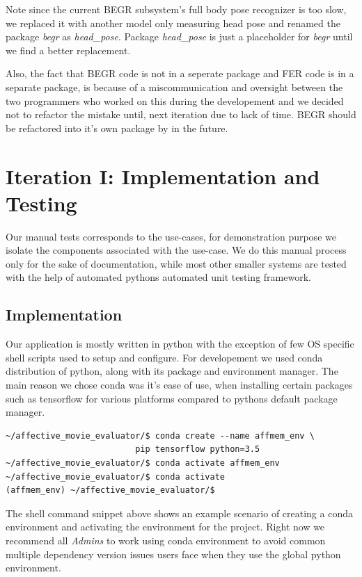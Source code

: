 \documentclass[12pt,a4paper,man]{report}
\begin{document}
Note since the current BEGR subsystem's full body pose recognizer is too slow, we replaced it with another model only measuring head pose and renamed the package \emph{begr} as \emph{head\_pose}. Package \emph{head\_pose} is just a placeholder for \emph{begr} until we find a better replacement. 

Also, the fact that BEGR code is not in a seperate package and FER code is in a separate package, is because of a miscommunication and oversight between the two programmers who worked on this during the developement and we decided not to refactor the mistake until, next iteration due to lack of time. BEGR should be refactored into it's own package by in the future.

\chapter{Iteration I: Implementation and Testing}
\label{sec:org5a514dc}

Our manual tests corresponds to the use-cases, for demonstration purpose we isolate the components associated with the use-case. We do this manual process only for the sake of documentation, while most other smaller systems are tested with the help of automated pythons automated unit testing framework.

\section{Implementation}
\label{sec:orgc1ee8ea}
Our application is mostly written in python with the exception of few OS specific shell scripts used to setup and configure. For developement we used conda distribution of python, along with its package and environment manager. The main reason we chose conda was it's ease of use, when installing certain packages such as tensorflow for various platforms compared to pythons default package manager.

\begin{verbatim}
~/affective_movie_evaluator/$ conda create --name affmem_env \
						  pip tensorflow python=3.5
~/affective_movie_evaluator/$ conda activate affmem_env
~/affective_movie_evaluator/$ conda activate 
(affmem_env) ~/affective_movie_evaluator/$ 
\end{verbatim}

The shell command snippet above shows an example scenario of creating a conda environment and activating the environment for the project. Right now we recommend all \emph{Admins} to work using conda environment to avoid common multiple dependency version issues users face when they use the global python environment.
\end{document}
